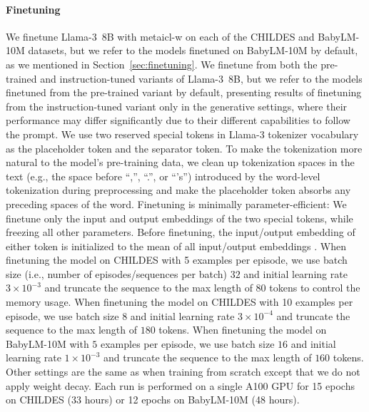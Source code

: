 \documentclass{article}
\begin{document}
\paragraph{Finetuning}
We finetune \mbox{Llama-3 8B} \citep{Llama-3} with \ac{metaicl-w} on each of the CHILDES and BabyLM-10M datasets, but we refer to the models finetuned on BabyLM-10M by default, as we mentioned in Section~\ref{sec:finetuning}.
We finetune from both the pre-trained and instruction-tuned variants of \mbox{Llama-3 8B}, but we refer to the models finetuned from the pre-trained variant by default, presenting results of finetuning from the instruction-tuned variant only in the generative settings, where their performance may differ significantly due to their different capabilities to follow the prompt.
We use two reserved special tokens in \mbox{Llama-3} tokenizer vocabulary as the placeholder token and the separator token.
To make the tokenization more natural to the model's pre-training data, we clean up tokenization spaces in the text (e.g., the space before ``,'', ``.'', or ``'s'') introduced by the word-level tokenization during preprocessing and make the placeholder token absorbs any preceding spaces of the word.
Finetuning is minimally parameter-efficient: We finetune only the input and output embeddings of the two special tokens, while freezing all other parameters. Before finetuning, the input/output embedding of either token is initialized to the mean of all input/output embeddings \citep{hewitt2021initializing}.
When finetuning the model on CHILDES with 5 examples per episode, we use batch size (i.e., number of episodes/sequences per batch) $32$ and initial learning rate $3 \times 10^{-3}$ and truncate the sequence to the max length of $80$ tokens to control the memory usage.
When finetuning the model on CHILDES with 10 examples per episode, we use batch size $8$ and initial learning rate $3 \times 10^{-4}$ and truncate the sequence to the max length of $180$ tokens.
When finetuning the model on BabyLM-10M with $5$ examples per episode, we use batch size $16$ and initial learning rate $1 \times 10^{-3}$ and truncate the sequence to the max length of $160$ tokens.
Other settings are the same as when training from scratch except that we do not apply weight decay.
Each run is performed on a single A100 GPU for 15 epochs on CHILDES (33 hours) or 12 epochs on BabyLM-10M (48 hours).

\newpage
\end{document}
